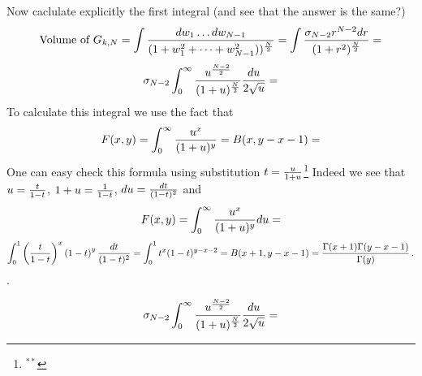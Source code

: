 Now caclulate explicitly the first integral (and see that the 
answer is the same?)
               $$\hbox {Volume of $G_{k,N}$}=
     \int {dw_1\dots dw_{N-1}\over 
(1+w_1^2+\dots+w_{N-1}^2))^{N\over 2}}=
\int {\sigma_{N-2}r^{N-2}dr\over (1+r^2)^{N\over 2}}=
               $$
              $$
       \sigma_{N-2}
                \int_0^{\infty} 
{u^{N-2\over 2}\over (1+u)^{N\over 2}}
           {du\over 2\sqrt u }= 
              $$
To calculate this  integral we use the fact that
                  $$
  F(x,y)=\int_0^\infty {u^x\over (1+u)^y}=B(x,y-x-1)=
                  $$
One can easy check this formula using substitution
$t={u\over 1+u}$\footnote{$^{**}$}
{Indeed we see that
   $u={t\over 1-t}$, $1+u={1\over 1-t}$,
$du={dt\over (1-t)^2}$ and
     $$
  F(x,y)=\int_0^\infty  {u^x\over (1+u)^y}du=
                   $$
                    $$
   \int_0^1 \left(t\over 1-t\right)^x
              \left(1-t\right)^y {dt\over (1-t)^2}=
   \int_0^1 t^x (1-t)^{y-x-2}=B(x+1,y-x-1)=
       {\Gamma(x+1)
       \Gamma(y-x-1)\over
       \Gamma(y)}\,.
     $$              
}.

             $$
       \sigma_{N-2}
                \int_0^{\infty} 
{u^{N-2\over 2}\over (1+u)^{N\over 2}}
           {du\over 2\sqrt u }=
             $$


\bye      
